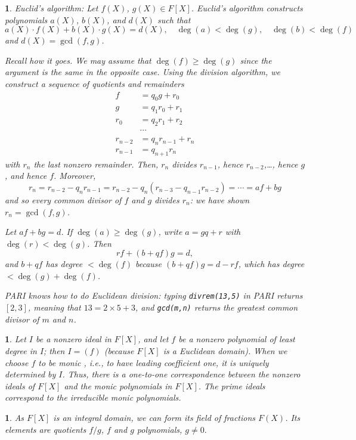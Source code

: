 \documentclass[a4paper,11pt,final,openany]{memoir}
\newtheorem{plain}[X]{}
\theoremstyle{nonumberplain}
\begin{document}
\begin{plain}
\label{ef3d}\emph{Euclid's algorithm}:%
Let $f(X)$, $g(X)\in F[X]$. Euclid's algorithm constructs polynomials $a(X)$,
$b(X)$, and $d(X)$ such that
\[
a(X)\cdot f(X)+b(X)\cdot g(X)=d(X),\quad\deg(a)<\deg(g),\quad\deg(b)<\deg(f)
\]
and $d(X)=\gcd(f,g)$.

Recall how it goes. We may assume that $\deg(f)\geq\deg(g)$ since the argument
is the same in the opposite case. Using the division algorithm, we construct a
sequence of quotients and remainders
\begin{align*}
f  &  =q_{0}g+r_{0}\\
g  &  =q_{1}r_{0}+r_{1}\\
r_{0}  &  =q_{2}r_{1}+r_{2}\\
&  \cdots\\
r_{n-2}  &  =q_{n}r_{n-1}+r_{n}\\
r_{n-1}  &  =q_{n+1}r_{n}%
\end{align*}
with $r_{n}$ the last nonzero remainder. Then, $r_{n}$ divides $r_{n-1}$,
hence $r_{n-2}$,\ldots, hence $g$, and hence $f$. Moreover,
\[
r_{n}=r_{n-2}-q_{n}r_{n-1}=r_{n-2}-q_{n}(r_{n-3}-q_{n-1}r_{n-2})=\cdots=af+bg
\]
and so every common divisor of $f$ and $g$ divides $r_{n}$: we have shown
$r_{n}=\gcd(f,g)$.

Let $af+bg=d$. If $\deg(a)\geq\deg(g)$, write $a=gq+r$ with $\deg(r)<\deg(g)$.
Then
\[
rf+(b+qf)g=d,
\]
and $b+qf$ has degree $<\deg(f)$ because $(b+qf)g=d-rf$, which has degree
$<\deg(g)+\deg(f)$.

PARI%
knows how to do Euclidean division: typing \verb|divrem(13,5)| in PARI returns
$[2,3]$, meaning that $13=2\times5+3$, and \verb|gcd(m,n)| returns the
greatest common divisor of $m$ and $n$.
\end{plain}

\begin{plain}
\label{ef3e}Let $I$ be a nonzero ideal in $F[X]$, and let $f$ be a nonzero
polynomial of least degree in $I$; then $I=(f)$ (because $F[X]$ is a Euclidean
domain). When we choose $f$ to be \emph{monic}%
%
, i.e., to have leading coefficient one, it is uniquely determined by $I$.
Thus, there is a one-to-one correspondence between the nonzero ideals of
$F[X]$ and the monic polynomials in $F[X]$. The prime ideals correspond to the
irreducible monic polynomials.
\end{plain}

\begin{plain}
\label{ef3f}As $F[X]$ is an integral domain, we can form its field of
fractions $F(X)$. Its elements are quotients $f/g$, $f$ and $g$ polynomials,
$g\neq0.$
\end{plain}
\end{document}
